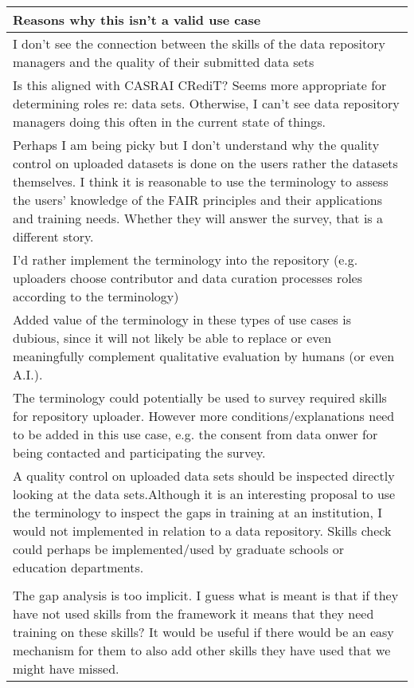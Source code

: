 \documentclass[]{article}
\begin{document}
\begin{table}[H]
\centering
\begin{tabular}{>{\raggedright\arraybackslash\columncolor{khaki}}p{30em}}
\hline
Reasons why this isn't a valid use case\\
\hline
I don't see the connection between the skills of the data repository managers and the quality of their submitted data sets\\
\hline
Is this aligned with CASRAI CRediT? Seems more appropriate for determining roles re: data sets. Otherwise, I can't see data repository managers doing this often in the current state of things.\\
\hline
Perhaps I am being picky but I don't understand why the quality control on uploaded datasets is done on the users rather the datasets themselves. I think it is reasonable to use the terminology to assess the users' knowledge of the FAIR principles and their applications and training needs. Whether they will answer the survey, that is a different story.\\
\hline
I'd rather implement the terminology into the repository (e.g. uploaders choose contributor and data curation processes roles according to the terminology)\\
\hline
Added value of the terminology in these types of use cases is dubious, since it will not likely be able to replace or even meaningfully complement qualitative evaluation by humans (or even A.I.).\\
\hline
The terminology could potentially be used to survey required skills for repository uploader. However more conditions/explanations need to be added in this use case, e.g. the consent from data onwer for being contacted and participating the survey.\\
\hline
A quality control on uploaded data sets should be inspected directly looking at the data sets.Although it is an interesting proposal to use the terminology to inspect the gaps in training at an institution, I would not implemented in relation to a data repository. Skills check could perhaps be implemented/used by graduate schools or education departments.\\
\hline
\\
\hline
The gap analysis is too implicit. I guess what is meant is that if they have not used skills from the framework it means that they need training on these skills? It would be useful if there would be an easy mechanism for them to also add other skills they have used that we might have missed.\\

\end{tabular}
\end{table}
\end{document}
